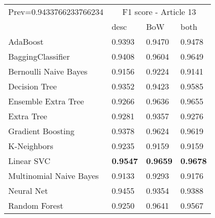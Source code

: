 \begin{tabular}{|l|l|l|l| }
\hline
Prev=0.9433766233766234 &  \multicolumn{3}{c|}{F1 score - Article 13} \\
\cline{2-4} & desc & BoW & both \\ \hline
AdaBoost                & 0.9393 & 0.9470 & 0.9478\\
BaggingClassifier       & 0.9408 & 0.9604 & 0.9649\\
Bernoulli Naive Bayes   & 0.9156 & 0.9224 & 0.9141\\
Decision Tree           & 0.9352 & 0.9423 & 0.9585\\
Ensemble Extra Tree     & 0.9266 & 0.9636 & 0.9655\\
Extra Tree              & 0.9281 & 0.9357 & 0.9276\\
Gradient Boosting       & 0.9378 & 0.9624 & 0.9619\\
K-Neighbors             & 0.9235 & 0.9159 & 0.9159\\
Linear SVC              & {\bf 0.9547} & {\bf 0.9659} & {\bf 0.9678}\\
Multinomial Naive Bayes & 0.9133 & 0.9293 & 0.9176\\
Neural Net              & 0.9455 & 0.9354 & 0.9388\\
Random Forest           & 0.9250 & 0.9641 & 0.9567\\
\hline
\end{tabular}